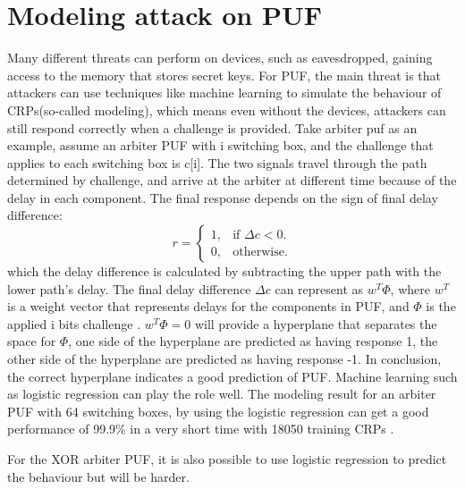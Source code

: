 \section{Modeling attack on PUF}
Many different threats can perform on devices, such as eavesdropped, gaining access to the memory that stores secret keys. For PUF, the main threat is that attackers can use techniques 
like machine learning to simulate the behaviour of CRPs(so-called modeling), which means even without the devices, attackers can still respond correctly when a challenge is 
provided. Take arbiter puf as an example, assume an arbiter PUF with i switching box, and the challenge that applies to each switching box is c[i]. The two signals travel through the 
path determined by challenge, and arrive at the arbiter at different time because of the delay in each component. The final response depends on the sign of final delay 
difference:
\begin{equation}
    r =\begin{cases}
    1, & \text{if $\Delta c<0$}.\\
    0, & \text{otherwise}.
    \end{cases}
\end{equation}
which the delay difference is calculated by subtracting the upper path with the lower path's delay. The final delay difference $\Delta c$ can represent as $w^{T}\Phi$, where $w^{T}$ is 
a weight vector that represents delays for the components in PUF, and $\Phi$ is the applied i bits challenge \cite{Reference5}. $w^{T}\Phi = 0$ will provide a hyperplane that separates the space for $\Phi$, one side of the hyperplane are predicted as having response 1, the other side of the hyperplane
are predicted as having response -1. In conclusion, the correct hyperplane indicates a good prediction of PUF. Machine learning such as logistic regression can play the role well. The modeling result for an arbiter PUF with 64 switching boxes, 
by using the logistic regression can get a good performance of 99.9\% in a very short time with 18050 training CRPs \cite{Reference6}.

For the XOR arbiter PUF, it is also possible to use logistic regression to predict the behaviour but will be harder.

